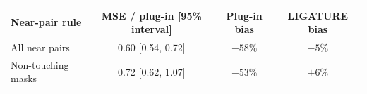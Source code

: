 \begin{tabular}{@{}lccc@{}}
\toprule
Near-pair rule & MSE / plug-in [95\% interval] & Plug-in bias & LIGATURE bias \\
\midrule
All near pairs & 0.60 [0.54, 0.72] & $-58\%$ & $-5\%$ \\
Non-touching masks & 0.72 [0.62, 1.07] & $-53\%$ & $+6\%$ \\
\bottomrule
\end{tabular}
